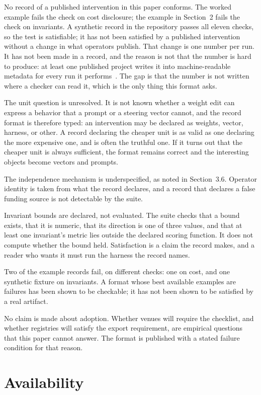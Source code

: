 \documentclass[11pt]{article}
\begin{document}
No record of a published intervention in this paper conforms. The worked
example fails the check on cost disclosure; the example in Section~2 fails the
check on invariants. A synthetic record in the repository passes all eleven
checks, so the test is satisfiable; it has not been satisfied by a published
intervention without a change in what operators publish. That change is one
number per run. It has not been made in a record, and the reason is not that the
number is hard to produce: at least one published project writes it into
machine-readable metadata for every run it performs~\cite{iwsp}. The gap is that
the number is not written where a checker can read it, which is the only thing
this format asks.

The unit question is unresolved. It is not known whether a weight edit can
express a behavior that a prompt or a steering vector cannot, and the record
format is therefore typed: an intervention may be declared as weights, vector,
harness, or other. A record declaring the cheaper unit is as valid as one
declaring the more expensive one, and is often the truthful one. If it turns
out that the cheaper unit is always sufficient, the format remains correct and
the interesting objects become vectors and prompts.

The independence mechanism is underspecified, as noted in Section~3.6. Operator
identity is taken from what the record declares, and a record that declares a
false funding source is not detectable by the suite.

Invariant bounds are declared, not evaluated. The suite checks that a bound
exists, that it is numeric, that its direction is one of three values, and that
at least one invariant's metric lies outside the declared scoring function. It
does not compute whether the bound held. Satisfaction is a claim the record
makes, and a reader who wants it must run the harness the record names.

Two of the example records fail, on different checks: one on cost, and one
synthetic fixture on invariants. A format whose best available examples are failures
has been shown to be checkable; it has not been shown to be satisfied by a real
artifact.

No claim is made about adoption. Whether venues will require the checklist, and
whether registries will satisfy the export requirement, are empirical questions
that this paper cannot answer. The format is published with a stated failure
condition for that reason.

\section{Availability}
\end{document}
